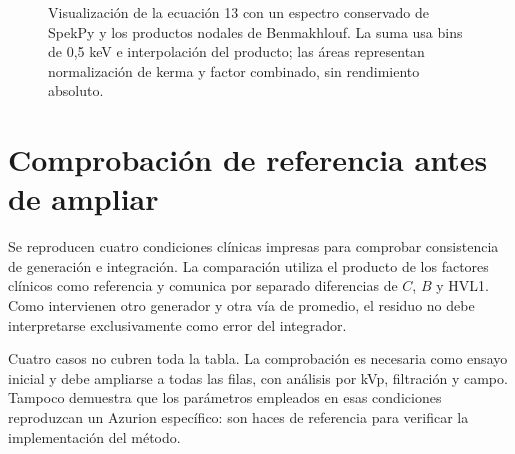 \begin{figure}[htbp]\centering
\caption{Visualización de la ecuación 13 con un espectro conservado de SpekPy y los productos nodales de Benmakhlouf. La suma usa bins de 0,5 keV e interpolación del producto; las áreas representan normalización de kerma y factor combinado, sin rendimiento absoluto.}\label{fig:kernel_integracion}\end{figure}

\section{Comprobación de referencia antes de ampliar}
Se reproducen cuatro condiciones clínicas impresas para comprobar consistencia de generación e integración. La comparación utiliza el producto de los factores clínicos como referencia y comunica por separado diferencias de $C$, $B$ y HVL1. Como intervienen otro generador y otra vía de promedio, el residuo no debe interpretarse exclusivamente como error del integrador.

Cuatro casos no cubren toda la tabla. La comprobación es necesaria como ensayo inicial y debe ampliarse a todas las filas, con análisis por kVp, filtración y campo. Tampoco demuestra que los parámetros empleados en esas condiciones reproduzcan un Azurion específico: son haces de referencia para verificar la implementación del método.
\FloatBarrier
